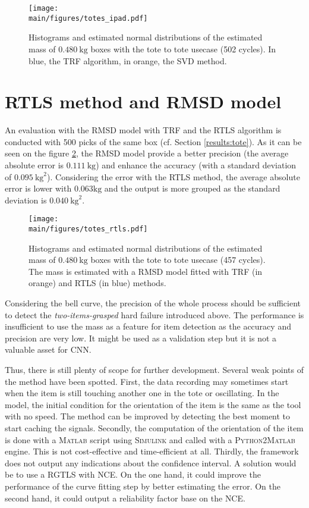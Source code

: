 \documentclass[/home/francois/latex/report/main.tex]{subfiles}
\begin{document}
\begin{figure}
  \centering
  \texttt{[image: \\main/figures/totes\_ipad.pdf]}
  \caption{Histograms and estimated normal distributions of the estimated mass of $0.480 \ \si{\kilogram}$ boxes with the tote to tote usecase (502 cycles). In blue, the \ac{TRF} algorithm, in orange, the \ac{SVD} method.}
  \label{fig:results:rigid-ls-tote}
\end{figure}

\section{\ac{RTLS} method and \ac{RMSD} model}

An evaluation with the \ac{RMSD} model with \ac{TRF} and the \ac{RTLS} algorithm is conducted with 500 picks of the same box (cf. Section \ref{results:tote}). As it can be seen on the figure \ref{fig:results:rmsd-rtls-tote}, the \ac{RMSD} model provide a better precision (the average absolute error is $0.111 \ \si{\kilogram}$) and enhance the accuracy (with a standard deviation of $0.095 \ \si{\kilogram\squared}$). Considering the error with the \ac{RTLS} method, the average absolute error is lower with $0.063 \si{\kilogram}$ and the output is more grouped as the standard deviation is $0.040 \ \si{\kilogram\squared}$.

\begin{figure}
  \centering
  \texttt{[image: \\main/figures/totes\_rtls.pdf]}
  \caption{Histograms and estimated normal distributions of the estimated mass of $0.480 \ \si{\kilogram}$ boxes with the tote to tote usecase (457 cycles). The mass is estimated with a \ac{RMSD} model fitted with \ac{TRF} (in orange) and \ac{RTLS} (in blue) methods.}
  \label{fig:results:rmsd-rtls-tote}
\end{figure}

Considering the bell curve, the precision of the whole process should be sufficient to detect the \textit{two-items-grasped} hard failure introduced above. The performance is insufficient to use the mass as a feature for item detection as the accuracy and precision are very low. It might be used as a validation step but it is not a valuable asset for \ac{CNN}.

Thus, there is still plenty of scope for further development. Several weak points of the method have been spotted. First, the data recording may sometimes start when the item is still touching another one in the tote or oscillating. In the model, the initial condition for the orientation of the item is the same as the tool with no speed. The method can be improved by detecting the best moment to start caching the signals. Secondly, the computation of the orientation of the item is done with a \textsc{Matlab} script using \textsc{Simulink} and called with a \textsc{Python2Matlab} engine. This is not cost-effective and time-efficient at all. Thirdly, the framework does not output any indications about the confidence interval. A solution would be to use a \ac{RGTLS} with \ac{NCE}. On the one hand, it could improve the performance of the curve fitting step by better estimating the error. On the second hand, it could output a reliability factor base on the \ac{NCE}.
\end{document}
